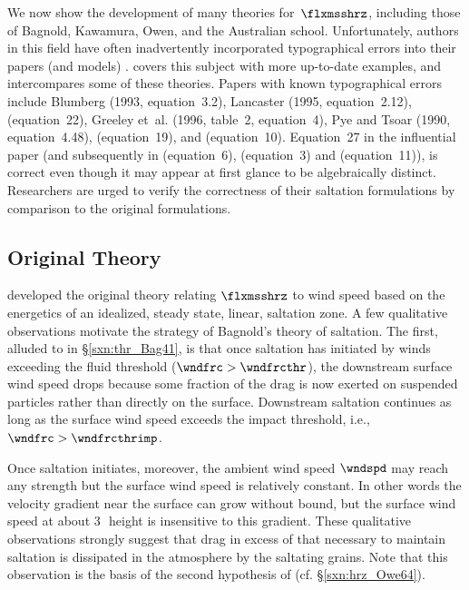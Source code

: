 \documentclass[12pt,twoside]{book}
\begin{document}
We now show the development of many theories for~$\flxmsshrz$,
including those of Bagnold, Kawamura, Owen, and the Australian school.
Unfortunately, authors in this field have often inadvertently
incorporated typographical errors into their papers (and models)
\cite[][]{NaS97}.
\cite{Baa05} covers this subject with more up-to-date examples, 
and intercompares some of these theories.
Papers with known typographical errors include 
Blumberg (1993, equation~3.2), 
Lancaster (1995, equation~2.12), 
\cite{Whi79} (equation~22),  
Greeley et~al. (1996, table~2, equation~4), 
Pye and Tsoar (1990, equation~4.48),
\cite{PaI02} (equation~19), and 
\cite{ZBN03} (equation~10).
Equation~27 in the influential paper \cite{MaB95} (and subsequently in
\cite{LuV02} (equation~6), \cite{THK02b} (equation~3) and \cite{ShL11}
(equation~11)), is correct even though it may appear at first glance
to be algebraically distinct.  
Researchers are urged to verify the correctness of their saltation
formulations by comparison to the original formulations.

\subsection[Original Theory]{Original Theory}\label{sxn:hrz_Bag41}
\cite{Bag41} developed the original theory relating $\flxmsshrz$ to
wind speed based on the energetics of an idealized, steady state,
linear, saltation zone.
A few qualitative observations motivate the strategy of Bagnold's
theory of saltation. 
The first, alluded to in \S\ref{sxn:thr_Bag41}, is that once
saltation has initiated by winds exceeding the fluid threshold
($\wndfrc > \wndfrcthr$), the downstream surface wind speed drops
because some fraction of the drag is now exerted on suspended
particles rather than directly on the surface. 
Downstream saltation continues as long as the surface wind speed
exceeds the impact threshold, i.e.,  $\wndfrc > \wndfrcthrimp$.

Once saltation initiates, moreover, the ambient wind speed $\wndspd$ 
may reach any strength but the surface wind speed is relatively constant.
In other words the velocity gradient near the surface can grow without 
bound, but the surface wind speed at about 3\,\mm\ height is insensitive
to this gradient.
These qualitative observations strongly suggest that drag in excess of
that necessary to maintain saltation is dissipated in the atmosphere
by the saltating grains.
Note that this observation is the basis of the second hypothesis of
\cite{Owe64} (cf. \S\ref{sxn:hrz_Owe64}).  
\end{document}

